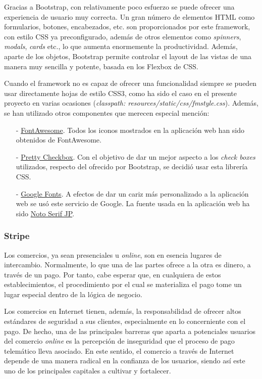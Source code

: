 \documentclass[a4paper]{article}
\begin{document}
    Gracias a Bootstrap, con relativamente poco esfuerzo se puede ofrecer una experiencia de usuario muy correcta. Un gran número de elementos HTML como formularios, botones, encabezados, etc. son proporcionados por este framework, con estilo CSS ya preconfigurado, además de otros elementos como \emph{spinners}, \emph{modals}, \emph{cards} etc., lo que aumenta enormemente la productividad.  Además, aparte de los objetos, Bootstrap permite controlar el layout de las vistas de una manera muy sencilla y potente, basada en los Flexbox de CSS.
    
    Cuando el framework no es capaz de ofrecer una funcionalidad siempre se pueden usar directamente hojas de estilo CSS3, como ha sido el caso en el presente proyecto en varias ocasiones (\emph{classpath: resources/static/css/fmstyle.css}). Además, se han utilizado otros componentes que merecen especial mención:
    
    \begin{itemize}
    	\item[-] \href{https://fontawesome.com/}{FontAwesome}. Todos los iconos mostrados en la aplicación web han sido obtenidos de FontAwesome.
    	\item[-] \href{https://lokesh-coder.github.io/pretty-checkbox/}{Pretty Checkbox}. Con el objetivo de dar un mejor aspecto a los \emph{check boxes} utilizados, respecto del ofrecido por Bootstrap, se decidió usar esta librería CSS.
    	\item[-] \href{https://fonts.google.com/}{Google Fonts}. A efectos de dar un cariz más personalizado a la aplicación web se usó este servicio de Google. La fuente usada en la aplicación web ha sido \href{https://fonts.google.com/specimen/Noto+Serif+JP}{Noto Serif JP}.
    \end{itemize}
    
    \subsubsection{Stripe} \label{sec:stripe}
    Los comercios, ya sean presenciales u \emph{online}, son en esencia lugares de intercambio. Normalmente, lo que una de las partes ofrece a la otra es dinero, a través de un pago. Por tanto, cabe esperar que, en cualquiera de estos establecimientos, el procedimiento por el cual se materializa el pago tome un lugar especial dentro de la lógica de negocio.
    
    Los comercios en Internet tienen, además, la responsabilidad de ofrecer altos estándares de seguridad a sus clientes, especialmente en lo concerniente con el pago. De hecho, una de las principales barreras que aparta a potenciales usuarios del comercio \emph{online} es la percepción de inseguridad que el proceso de pago telemático lleva asociado. En este sentido, el comercio a través de Internet depende de una manera radical en la confianza de los usuarios, siendo así este uno de los principales capitales a cultivar y fortalecer.
    
\end{document}
